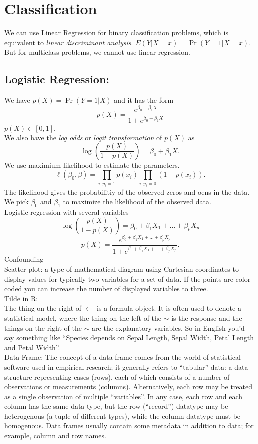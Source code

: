 \documentclass[11pt, a4paper]{article}
\begin{document}
\section{Classification}
We can use Linear Regression for binary classification problems, which is equivalent to \emph{linear discriminant analysis}. $E(Y|X=x)=\operatorname{Pr}(Y=1|X=x)$. But for multiclass problems, we cannot use linear regression.\\[1mm]
\subsection{Logistic Regression:}
We have $p(X)=\operatorname{Pr}(Y=1|X)$ and it has the form
\[
  p(X)=\frac{e^{\beta_0+\beta_1X}}{1+e^{\beta_0+\beta_1X}}
\]
$p(X)\in [0,1]$.\\
We also have the \emph{log odds} or \emph{logit transformation} of $p(X)$ as
\[
  \log(\frac{p(X)}{1-p(X)})=\beta_0+\beta_1 X.
\]
We use maximium likelihood to estimate the parameters.
\[
  \ell(\beta_0,\beta)=\prod_{i:y_i=1}p(x_i)\prod_{i:y_i=0}(1-p(x_i)).
\]
The likelihood gives the probabilitiy of the observed zeros and oens in the data. We pick $\beta_0$ and $\beta_1$ to maximize the likelihood of the observed data.\\[1mm]
Logistic regression with several variables
\[
  \log(\frac{p(X)}{1-p(X)})=\beta_0+\beta_1X_1+\dots+\beta_pX_p
\]
\[
  p(X)=\frac{e^{\beta_0+\beta_1X_1+\dots+\beta_pX_p}}{1+e^{\beta_0+\beta_1X_1+\dots+\beta_pX_p}}.
\]
Confounding\\
Scatter plot: a type of mathematical diagram using Cartesian coordinates to display values for typically two variables for a set of data. If the points are color-coded you can increase the number of displayed variables to three.\\[1mm]
Tilde in R:\\
The thing on the right of $\leftarrow$ is a formula object. It is often used to denote a statistical model, where the thing on the left of the $\sim$ is the response and the things on the right of the $\sim$ are the explanatory variables. So in English you'd say something like ``Species depends on Sepal Length, Sepal Width, Petal Length and Petal Width''.\\
Data Frame: The concept of a data frame comes from the world of statistical software used in empirical research; it generally refers to ``tabular'' data: a data structure representing cases (rows), each of which consists of a number of observations or measurements (columns). Alternatively, each row may be treated as a single observation of multiple ``variables''. In any case, each row and each column has the same data type, but the row (``record'') datatype may be heterogenous (a tuple of different types), while the column datatype must be homogenous. Data frames usually contain some metadata in addition to data; for example, column and row names.\\[1mm]
\end{document}
